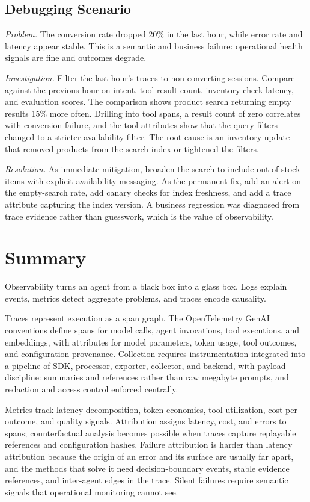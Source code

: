 \documentclass[11pt]{book}
\begin{document}
\subsection{Debugging Scenario}

\textit{Problem.} The conversion rate dropped 20\% in the last hour, while error rate and latency appear stable. This is a semantic and business failure: operational health signals are fine and outcomes degrade.

\textit{Investigation.} Filter the last hour's traces to non-converting sessions. Compare against the previous hour on intent, tool result count, inventory-check latency, and evaluation scores. The comparison shows product search returning empty results 15\% more often. Drilling into tool spans, a result count of zero correlates with conversion failure, and the tool attributes show that the query filters changed to a stricter availability filter. The root cause is an inventory update that removed products from the search index or tightened the filters.

\textit{Resolution.} As immediate mitigation, broaden the search to include out-of-stock items with explicit availability messaging. As the permanent fix, add an alert on the empty-search rate, add canary checks for index freshness, and add a trace attribute capturing the index version. A business regression was diagnosed from trace evidence rather than guesswork, which is the value of observability.

\section{Summary}

Observability turns an agent from a black box into a glass box. Logs explain events, metrics detect aggregate problems, and traces encode causality.

Traces represent execution as a span graph. The OpenTelemetry GenAI conventions define spans for model calls, agent invocations, tool executions, and embeddings, with attributes for model parameters, token usage, tool outcomes, and configuration provenance. Collection requires instrumentation integrated into a pipeline of SDK, processor, exporter, collector, and backend, with payload discipline: summaries and references rather than raw megabyte prompts, and redaction and access control enforced centrally.

Metrics track latency decomposition, token economics, tool utilization, cost per outcome, and quality signals. Attribution assigns latency, cost, and errors to spans; counterfactual analysis becomes possible when traces capture replayable references and configuration hashes. Failure attribution is harder than latency attribution because the origin of an error and its surface are usually far apart, and the methods that solve it need decision-boundary events, stable evidence references, and inter-agent edges in the trace. Silent failures require semantic signals that operational monitoring cannot see.
\end{document}
